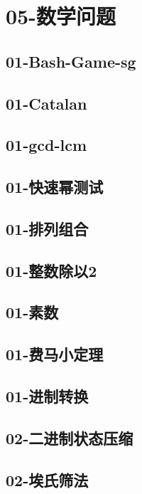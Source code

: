 \documentclass[10pt,a4paper]{article}
\begin{document}
\section{05-数学问题}
\subsection{01-Bash-Game-sg}

\subsection{01-Catalan}

\subsection{01-gcd-lcm}

\subsection{01-快速幂测试}

\subsection{01-排列组合}

\subsection{01-整数除以2}

\subsection{01-素数}

\subsection{01-费马小定理}

\subsection{01-进制转换}

\subsection{02-二进制状态压缩}

\subsection{02-埃氏筛法}

\end{document}

